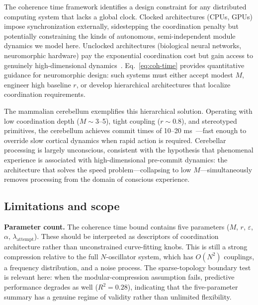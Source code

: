 \documentclass[12pt]{article}
\begin{document}
The coherence time framework identifies a design constraint for any distributed computing system that lacks a global clock. Clocked architectures (CPUs, GPUs) impose synchronization externally, sidestepping the coordination penalty but potentially constraining the kinds of autonomous, semi-independent module dynamics we model here. Unclocked architectures (biological neural networks, neuromorphic hardware) pay the exponential coordination cost but gain access to genuinely high-dimensional dynamics~\cite{todd2025intelligence}. Eq.~\ref{eq:coh-time} provides quantitative guidance for neuromorphic design: such systems must either accept modest $M$, engineer high baseline $r$, or develop hierarchical architectures that localize coordination requirements.

The mammalian cerebellum exemplifies this hierarchical solution. Operating with low coordination depth ($M \sim 3$--5), tight coupling ($r \sim 0.8$), and stereotyped primitives, the cerebellum achieves commit times of 10--20 ms~\cite{wolpert1998,ito2008}---fast enough to override slow cortical dynamics when rapid action is required. Cerebellar processing is largely unconscious, consistent with the hypothesis that phenomenal experience is associated with high-dimensional pre-commit dynamics: the architecture that solves the speed problem---collapsing to low $M$---simultaneously removes processing from the domain of conscious experience.

\subsection{Limitations and scope}

\textbf{Parameter count.} The coherence time bound contains five parameters ($M$, $r$, $\varepsilon$, $\alpha$, $\lambda_{\text{attempt}}$). These should be interpreted as descriptors of coordination architecture rather than unconstrained curve-fitting knobs. This is still a strong compression relative to the full $N$-oscillator system, which has $O(N^2)$ couplings, a frequency distribution, and a noise process. The sparse-topology boundary test is relevant here: when the modular-compression assumption fails, predictive performance degrades as well ($R^2 = 0.28$), indicating that the five-parameter summary has a genuine regime of validity rather than unlimited flexibility.
\end{document}
